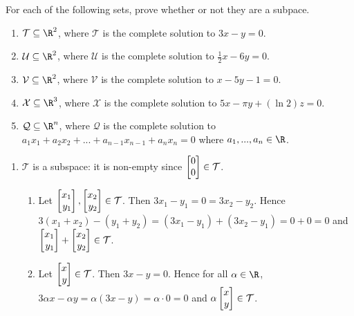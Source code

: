 \begin{exercises}
	\begin{problist}

		\prob For each of the following sets, prove whether or not they are a subpace.
		\begin{enumerate}
			\item  $\mathcal T \subseteq \R^2$, where $\mathcal T$ is the complete solution to $3x-y=0$.
			\item  $\mathcal U \subseteq \R^2$, where $\mathcal U$ is the complete solution to $\frac{1}{2}x-6y=0$.
			\item  $\mathcal V \subseteq \R^2$, where $\mathcal V$ is the complete solution to $x-5y-1=0$.
			\item  $\mathcal X \subseteq \R^3$, where $\mathcal X$ is the complete solution to
			$5x-\pi y + (\ln 2)z=0$.
			\item $\mathcal Q \subseteq \R^n$, where $\mathcal Q$ is the complete solution to
			$a_1x_1+a_2x_2+...+a_{n-1}x_{n-1}+a_nx_n=0$ where $a_1,...,a_n \in \R$.
		\end{enumerate}
		\begin{solution}
			\begin{enumerate}
				\item $\mathcal T$ is a subspace: it is non-empty since $\mat{0\\0}\in\mathcal T$. 
				\begin{enumerate}
					\item Let $\mat{x_1\\y_1},\mat{x_2\\y_2}\in \mathcal T$. 
						Then $3x_1-y_1=0=3x_2-y_2$. Hence $3(x_1+x_2)-(y_1+y_2)=(3x_1-y_1)+(3x_2-y_1)=0+0=0$ 
						and $\mat{x_1\\y_1}+\mat{x_2\\y_2}\in\mathcal T$.
					\item Let $\mat{x\\y}\in\mathcal T$. Then $3x-y=0$. Hence for all $\alpha\in\R$, 
						$3\alpha x-\alpha y=\alpha(3x-y)=\alpha\cdot 0=0$ and $\alpha\mat{x\\y}\in\mathcal T$.
				\end{enumerate}


\end{enumerate}
\end{solution}
\end{problist}
\end{exercises}
